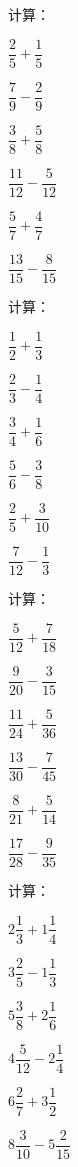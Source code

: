 \documentclass[a4paper,12pt]{ctexart}
\begin{document}
\begin{exercise}
\item 计算：
  \begin{subexercise}
    \item $\dfrac{2}{5}+\dfrac{1}{5}$
    \item $\dfrac{7}{9}-\dfrac{2}{9}$
    \item $\dfrac{3}{8}+\dfrac{5}{8}$
    \item $\dfrac{11}{12}-\dfrac{5}{12}$
    \item $\dfrac{5}{7}+\dfrac{4}{7}$
    \item $\dfrac{13}{15}-\dfrac{8}{15}$
  \end{subexercise}

\item 计算：
  \begin{subexercise}
    \item $\dfrac{1}{2}+\dfrac{1}{3}$
    \item $\dfrac{2}{3}-\dfrac{1}{4}$
    \item $\dfrac{3}{4}+\dfrac{1}{6}$
    \item $\dfrac{5}{6}-\dfrac{3}{8}$
    \item $\dfrac{2}{5}+\dfrac{3}{10}$
    \item $\dfrac{7}{12}-\dfrac{1}{3}$
  \end{subexercise}

\item 计算：
  \begin{subexercise}
    \item $\dfrac{5}{12}+\dfrac{7}{18}$
    \item $\dfrac{9}{20}-\dfrac{3}{15}$
    \item $\dfrac{11}{24}+\dfrac{5}{36}$
    \item $\dfrac{13}{30}-\dfrac{7}{45}$
    \item $\dfrac{8}{21}+\dfrac{5}{14}$
    \item $\dfrac{17}{28}-\dfrac{9}{35}$
  \end{subexercise}

\item 计算：
  \begin{subexercise}
    \item $2\dfrac{1}{3}+1\dfrac{1}{4}$
    \item $3\dfrac{2}{5}-1\dfrac{1}{3}$
    \item $5\dfrac{3}{8}+2\dfrac{1}{6}$
    \item $4\dfrac{5}{12}-2\dfrac{1}{4}$
    \item $6\dfrac{2}{7}+3\dfrac{1}{2}$
    \item $8\dfrac{3}{10}-5\dfrac{2}{15}$
  \end{subexercise}


\end{exercise}
\end{document}

